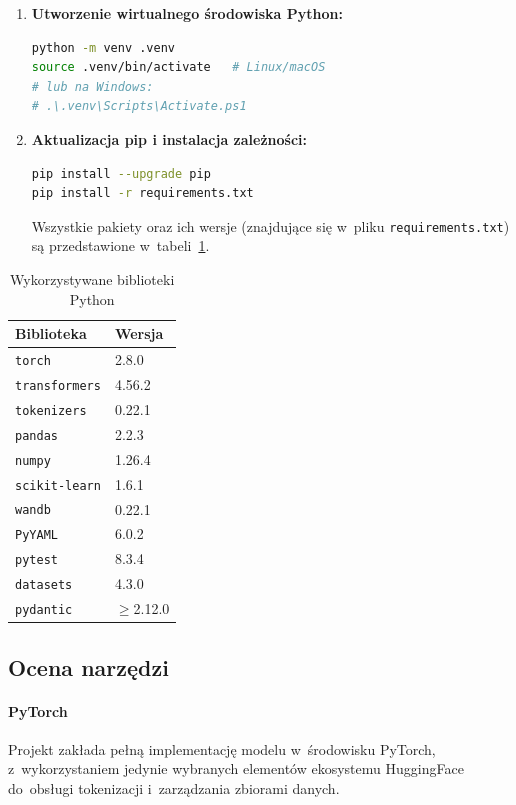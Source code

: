 \documentclass[a4paper,11pt,twoside]{report}
\theoremstyle{definition}
\begin{document}
\begin{enumerate}    
    \item \textbf{Utworzenie wirtualnego środowiska Python:}
\begin{lstlisting}[language=bash, caption={Tworzenie środowiska wirtualnego}]
python -m venv .venv
source .venv/bin/activate   # Linux/macOS
# lub na Windows:
# .\.venv\Scripts\Activate.ps1
\end{lstlisting}
    
    \item \textbf{Aktualizacja pip i instalacja zależności:}
\begin{lstlisting}[language=bash, caption={Instalacja zależności}]
pip install --upgrade pip
pip install -r requirements.txt
\end{lstlisting}
    Wszystkie pakiety oraz ich wersje (znajdujące się w~pliku \texttt{requirements.txt}) są przedstawione w~tabeli~\ref{tab:requirements}.
\end{enumerate}



\begin{table}[t!]
\centering
\caption{Wykorzystywane biblioteki Python}
\label{tab:requirements}
\smallskip
\small
\begin{tabular}{ll}
\toprule
\textbf{Biblioteka} & \textbf{Wersja} \\
\midrule
\texttt{torch} & 2.8.0 \\
\texttt{transformers} & 4.56.2 \\
\texttt{tokenizers} & 0.22.1 \\
\texttt{pandas} & 2.2.3 \\
\texttt{numpy} & 1.26.4 \\
\texttt{scikit-learn} & 1.6.1 \\
\texttt{wandb} & 0.22.1 \\
\texttt{PyYAML} & 6.0.2 \\
\texttt{pytest} & 8.3.4 \\
\texttt{datasets} & 4.3.0 \\
\texttt{pydantic} & $\ge$2.12.0 \\
\bottomrule
\end{tabular}
\end{table}

\subsection{Ocena narzędzi}

\paragraph{PyTorch}  
Projekt zakłada pełną implementację modelu w~środowisku PyTorch, z~wykorzystaniem jedynie wybranych elementów ekosystemu HuggingFace do~obsługi tokenizacji i~zarządzania zbiorami danych.
\end{document}
